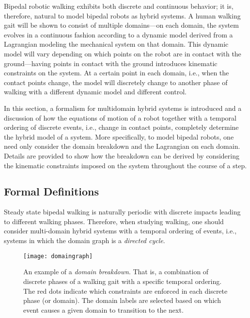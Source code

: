 Bipedal robotic walking exhibits both discrete and continuous behavior; it is,
therefore, natural to model bipedal robots as hybrid systems.\xspace
%
A human walking gait will be shown to consist of multiple domains---on each
domain, the system evolves in a continuous fashion according to a dynamic model
derived from a Lagrangian modeling the mechanical system on that domain.
%
This dynamic model will vary depending on which points on the robot are in
contact with the ground---having points in contact with the ground introduces
kinematic constraints on the system.
%
At a certain point in each domain, i.e., when the contact points change, the
model will discretely change to another phase of walking with a different
dynamic model and different control.
%

In this section, a formalism for multidomain hybrid systems is introduced and a
discussion of how the equations of motion of a robot together with a temporal
ordering of discrete events, i.e., change in contact points, completely
determine the hybrid model of a system.
%
More specifically, to model bipedal robots, one need only consider the domain
breakdown and the Lagrangian on each domain.
%
Details are provided to show how the breakdown can be derived by considering the
kinematic constraints imposed on the system throughout the course of a step.


\subsection{Formal Definitions}

Steady state bipedal walking is naturally periodic with discrete impacts leading
to different walking phases.
%
Therefore, when studying walking, one should consider multi-domain hybrid
systems with a temporal ordering of events, i.e., systems in which the domain
graph is a {\em directed cycle}.

\begin{figure}[t]
  \centering
  \texttt{[image: domaingraph]}
  \caption[An example of a {\em domain breakdown}.]{An example of a {\em domain
      breakdown}.
    That is, a combination of discrete phases of a walking gait with a specific
    temporal ordering. The red dots indicate which constraints are enforced in
    each discrete phase (or domain).
    The domain labels are selected based on which event causes a given domain to
    transition to the next.}
  \label{fig:domaingraph}
\end{figure}

